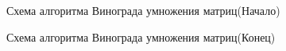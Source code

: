 \documentclass[a4paper,12pt]{article}
\begin{document}
\begin{figure}[p]
\caption{Схема алгоритма Винограда умножения матриц(Начало)}
\label{images:multiply_vinograd1}
\end{figure}

\begin{figure}[p]
\caption{Схема алгоритма Винограда умножения матриц(Конец)}
\label{images:multiply_vinograd2}
\end{figure}
\end{document}
